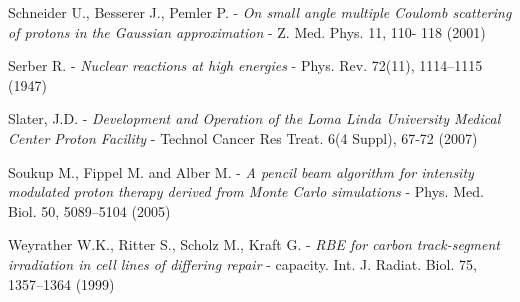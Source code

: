 \documentclass[12pt, a4paper, twoside]{book}
\begin{document}
\begin{thebibliography}{99}
Schneider U., Besserer J., Pemler P. - 
\emph{On small angle multiple Coulomb scattering of protons in the Gaussian approximation} - 
Z. Med. Phys. 11,  110- 118 (2001)

Serber R. - 
\emph{Nuclear reactions at high energies} -
Phys. Rev. 72(11), 1114–1115 (1947)

Slater, J.D. -
\emph{Development and Operation of the Loma Linda University Medical Center Proton Facility} -
Technol Cancer Res Treat. 6(4 Suppl), 67-72 (2007)

Soukup M., Fippel M. and Alber M. -
\emph{A pencil beam algorithm for intensity modulated proton therapy derived from Monte Carlo simulations} -
Phys. Med. Biol. 50, 5089–5104 (2005)

Weyrather W.K., Ritter S., Scholz M., Kraft G. - 
\emph{RBE for carbon track-segment irradiation in cell lines of differing repair} -
capacity. Int. J. Radiat. Biol. 75, 1357–1364 (1999)




\end{thebibliography}




\end{document}
